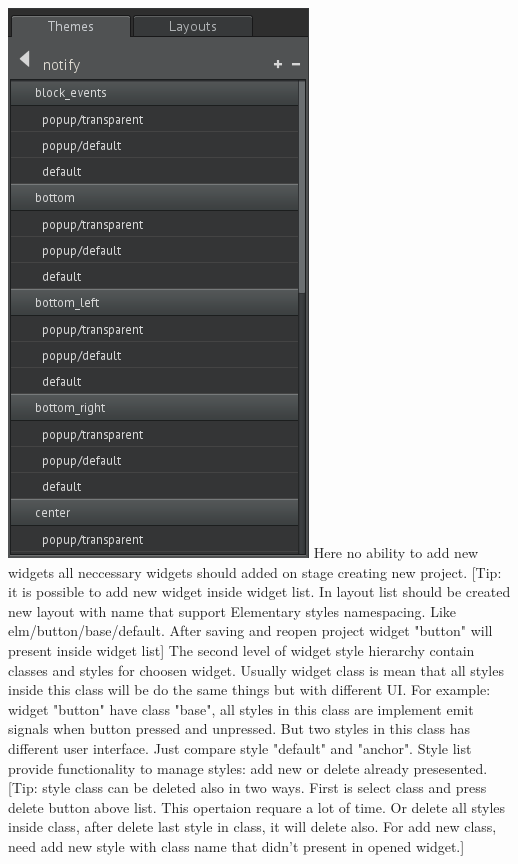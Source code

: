 \documentclass[titlepage,oneside,11pt]{book}
\begin{document}
\includegraphics[scale=0.5]{images/class_list.png}\newline
Here no ability to add new widgets all neccessary widgets should added on stage creating new project. [Tip: it is possible to add new widget inside widget list. In layout list should be created new layout with name that support Elementary styles namespacing. Like elm/button/base/default. After saving and reopen project widget "{}button"{} will present inside widget list]\newline
The second level of widget style hierarchy contain classes and styles for choosen widget. Usually widget class is mean that all styles inside this class will be do the same things but with different UI. For example: widget "{}button"{} have class "{}base"{}, all styles in this class are implement emit signals when button pressed and unpressed. But two styles in this class has different user interface. Just compare style "{}default"{} and "{}anchor"{}.\newline
Style list provide functionality to manage styles: add new or delete already presesented. [Tip: style class can be deleted also in two ways. First is select class and press delete button above list. This opertaion requare a lot of time. Or delete all styles inside class, after delete last style in class, it will delete also. For add new class, need add new style with class name that didn't present in opened widget.]
\end{document}

